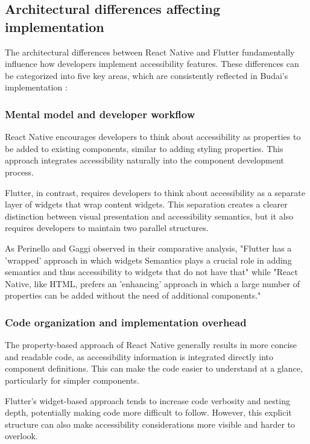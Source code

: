 \subsection{Architectural differences affecting implementation}
\label{subsec:arch-differences}

The architectural differences between React Native and Flutter fundamentally influence how developers implement accessibility features. These differences can be categorized into five key areas, which are consistently reflected in Budai's implementation \cite{budai2024mobile}:

\subsubsection{Mental model and developer workflow}
React Native encourages developers to think about accessibility as properties to be added to existing components, similar to adding styling properties. This approach integrates accessibility naturally into the component development process.

Flutter, in contrast, requires developers to think about accessibility as a separate layer of widgets that wrap content widgets. This separation creates a clearer distinction between visual presentation and accessibility semantics, but it also requires developers to maintain two parallel structures.

As Perinello and Gaggi \cite{perinello2024accessibility} observed in their comparative analysis, "Flutter has a 'wrapped' approach in which widgets Semantics plays a crucial role in adding semantics and thus accessibility to widgets that do not have that" while "React Native, like HTML, prefers an 'enhancing' approach in which a large number of properties can be added without the need of additional components."

\subsubsection{Code organization and implementation overhead}
The property-based approach of React Native generally results in more concise and readable code, as accessibility information is integrated directly into component definitions. This can make the code easier to understand at a glance, particularly for simpler components.

Flutter's widget-based approach tends to increase code verbosity and nesting depth, potentially making code more difficult to follow. However, this explicit structure can also make accessibility considerations more visible and harder to overlook.

